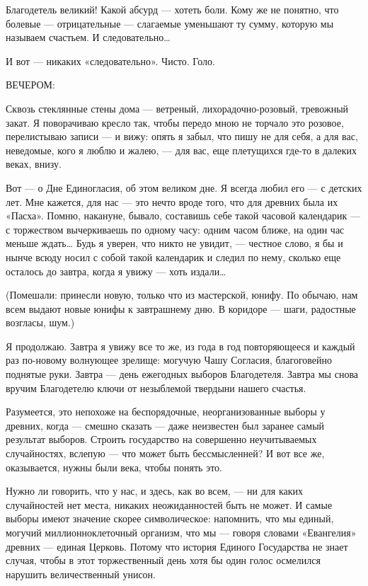 \documentclass[11pt,openany]{book}
\begin{document}
Благодетель великий! Какой абсурд --- хотеть боли. Кому же не понятно, что болевые --- отрицательные --- слагаемые уменьшают ту сумму, которую мы называем счастьем. И следовательно\ldots{}

И вот --- никаких «следовательно». Чисто. Голо.

\begin{center}\textsc{ВЕЧЕРОМ:}\end{center}

Сквозь стеклянные стены дома --- ветреный, лихорадочно-розовый, тревожный закат. Я поворачиваю кресло так, чтобы передо мною не торчало это розовое, перелистываю записи --- и вижу: опять я забыл, что пишу не для себя, а для вас, неведомые, кого я люблю и жалею, --- для вас, еще плетущихся где-то в далеких веках, внизу.

Вот --- о Дне Единогласия, об этом великом дне. Я всегда любил его --- с детских лет. Мне кажется, для нас --- это нечто вроде того, что для древних была их «Пасха». Помню, накануне, бывало, составишь себе такой часовой календарик --- с торжеством вычеркиваешь по одному часу: одним часом ближе, на один час меньше ждать\ldots{} Будь я уверен, что никто не увидит, --- честное слово, я бы и нынче всюду носил с собой такой календарик и следил по нему, сколько еще осталось до завтра, когда я увижу --- хоть издали\ldots{}

(Помешали: принесли новую, только что из мастерской, юнифу. По обычаю, нам всем выдают новые юнифы к завтрашнему дню. В коридоре --- шаги, радостные возгласы, шум.)

Я продолжаю. Завтра я увижу все то же, из года в год повторяющееся и каждый раз по-новому волнующее зрелище: могучую Чашу Согласия, благоговейно поднятые руки. Завтра --- день ежегодных выборов Благодетеля. Завтра мы снова вручим Благодетелю ключи от незыблемой твердыни нашего счастья.

Разумеется, это непохоже на беспорядочные, неорганизованные выборы у древних, когда --- смешно сказать --- даже неизвестен был заранее самый результат выборов. Строить государство на совершенно неучитываемых случайностях, вслепую --- что может быть бессмысленней? И вот все же, оказывается, нужны были века, чтобы понять это.

Нужно ли говорить, что у нас, и здесь, как во всем, --- ни для каких случайностей нет места, никаких неожиданностей быть не может. И самые выборы имеют значение скорее символическое: напомнить, что мы единый, могучий миллионноклеточный организм, что мы --- говоря словами «Евангелия» древних --- единая Церковь. Потому что история Единого Государства не знает случая, чтобы в этот торжественный день хотя бы один голос осмелился нарушить величественный унисон.
\end{document}
